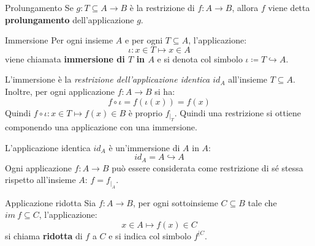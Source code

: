 \begin{defbox}{Prolungamento}
	Se $g: T \subseteq A \longrightarrow B $ è la restrizione di $f: A \longrightarrow B$, allora $f$ viene detta \textbf{prolungamento} dell'applicazione $g$.
\end{defbox}



\begin{defbox}{Immersione}
	Per ogni insieme $A$ e per ogni $T \subseteq A$, l'applicazione:
	\begin{equation}
		\iota:	x \in T \mapsto x \in A
	\end{equation}
	viene chiamata \textbf{immersione di $T$ in $A$} e si denota col simbolo $\iota \coloneqq T \hookrightarrow A$.
\end{defbox}



\begin{osservation}
	L'immersione è la \textit{restrizione dell'applicazione identica $id_{A}$} all'insieme $T \subseteq A$. Inoltre, per ogni applicazione $f: A \longrightarrow B$ si ha:
	\begin{displaymath}
		f \circ \iota = f( \iota(x))= f(x)
	\end{displaymath}
	Quindi $f \circ \iota : x \in T \mapsto f(x) \in B$ è proprio $f_{\vert_{T}}$. Quindi una restrizione si ottiene componendo una applicazione con una immersione.
	
\end{osservation}

\begin{example}
	L'applicazione identica $id_{A}$ è un'immersione di $A$ in $A$:
	\begin{displaymath}
		id_{A} = A \hookrightarrow A
	\end{displaymath}
	Ogni applicazione $f: A \longrightarrow B$ può essere considerata come restrizione di sé stessa rispetto all'insieme $A$: $f = f_{\vert_{A}}$.
\end{example}


\begin{defbox}{Applicazione ridotta}
	Sia $f:A\rightarrow B$, per ogni sottoinsieme $C \subseteq B$ tale che $im \ f \subseteq C$, l'applicazione:
	\begin{equation}
		x \in A \mapsto f(x)\in C
	\end{equation}
	si chiama \textbf{ridotta} di $f$ a $C$ e si indica col simbolo $f^{\vert C}$.
\end{defbox}



